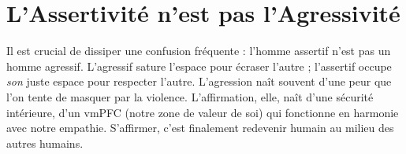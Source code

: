 \section{L'Assertivité n'est pas l'Agressivité}
Il est crucial de dissiper une confusion fréquente : l'homme assertif n'est pas un homme agressif. L'agressif sature l'espace pour écraser l'autre ; l'assertif occupe \textit{son} juste espace pour respecter l'autre. L'agression naît souvent d'une peur que l'on tente de masquer par la violence. L'affirmation, elle, naît d'une sécurité intérieure, d'un vmPFC (notre zone de valeur de soi) qui fonctionne en harmonie avec notre empathie. S'affirmer, c'est finalement redevenir humain au milieu des autres humains.

